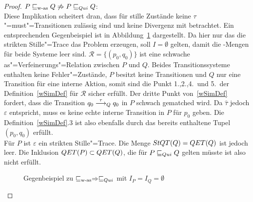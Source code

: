 \begin{proof}
  $P \sqsubseteq _{\mathrm{w}\text{-}\mathrm{as}} Q \not\Rightarrow P  \sqsubseteq  _{Qui} Q$:\\
  Diese Implikation scheitert dran, dass für stille Zustände keine
  $\tau$"=must"=Transitionen zulässig sind und \QRel{} keine Divergenz mit
  betrachtet. Ein entsprechenden Gegenbeispiel ist in
  Abbildung~\ref{QuiWasGegenBsp} dargestellt. Da hier nur das die strikten
  Stille"=Trace das Problem erzeugen, soll $I = \emptyset$ gelten, damit die
  \MIT{}-Mengen für beide Systeme leer sind. $\mathcal{R} = \{(p_0,q_0)\}$ ist
  eine schwache as"=Verfeinerungs"=Relation zwischen $P$ und $Q$. Beides
  Transitionssysteme enthalten keine Fehler"=Zustände, $P$ besitzt keine
  Transitionen und $Q$ nur eine Transition für eine interne Aktion, somit sind
  die Punkt 1.,2.,4.\ und 5.\ der Definition~\ref{wSimDef} für $\mathcal{R}$
  sicher erfüllt. Der dritte Punkt von~\ref{wSimDef} fordert, dass die
  Transition $q_0 \must[\tau]_Q q_0$ in $P$ schwach gematched wird. Da
  $\hat{\tau}$ jedoch $\varepsilon$ entspricht, muss es keine echte interne
  Transition in $P$ für $p_0$ geben. Die Definition~\ref{wSimDef}.3 ist also
  ebenfalls durch das bereits enthaltene Tupel $(p_0,q_0)$ erfüllt.\\
  Für $P$ ist $\varepsilon$ ein strikten Stille"=Trace. Die Menge $StQT (Q) =
  QET (Q)$ ist jedoch leer. Die Inklusion $QET (P) \subset QET (Q)$, die für
  $P \sqsubseteq  _{Qui} Q$ gelten müsste ist also nicht erfüllt.

  \begin{figure}[htbp]
    \begin{center}
      \caption{Gegenbeispiel zu $\sqsubseteq _{\mathrm{w}\text{-}\mathrm{as}} \Rightarrow  \sqsubseteq  _{Qui}$ mit $I_P = I_Q =
      \emptyset$}
      \label{QuiWasGegenBsp}
    \end{center}
  \end{figure}


\end{proof}
